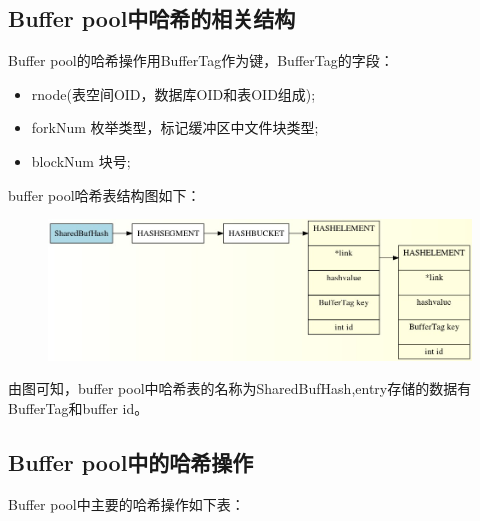 \documentclass{article}
\begin{document}
\begin{CJK*}{UTF8}{gkai}
\subsection{Buffer pool中哈希的相关结构}
\indent Buffer pool的哈希操作用BufferTag作为键，BufferTag的字段：

\begin{itemize}
\item \quad rnode(表空间OID，数据库OID和表OID组成);\\
\item \quad forkNum 枚举类型，标记缓冲区中文件块类型;\\
\item \quad blockNum  块号;
\end{itemize}


\indent buffer pool哈希表结构图如下：
\begin{figure}[H] 
\centering
\includegraphics[width = \textwidth]{buf.jpg}
\caption{}
\label{overflow}
\end{figure}
\indent 由图可知，buffer pool中哈希表的名称为SharedBufHash,entry存储的数据有BufferTag和buffer id。

\subsection{Buffer pool中的哈希操作}

\indent Buffer pool中主要的哈希操作如下表：


\end{CJK*}
\end{document}
